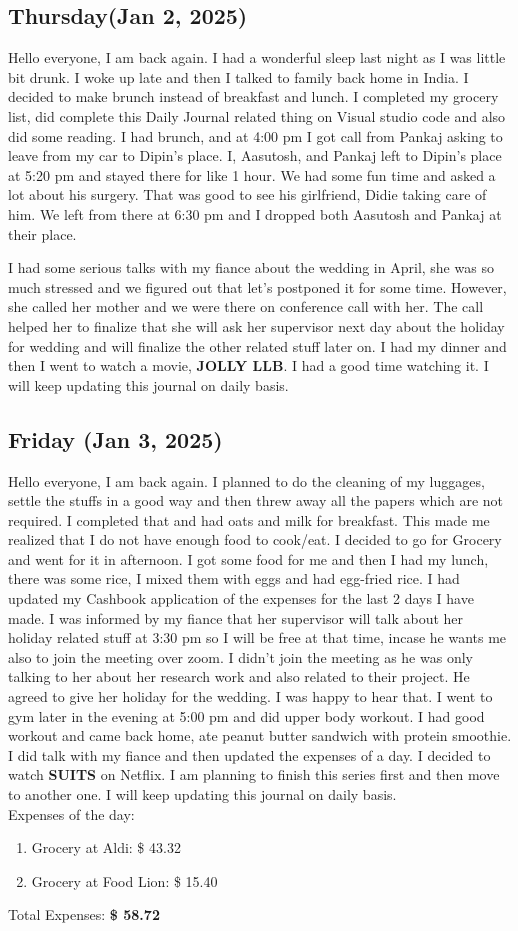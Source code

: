 \subsection*{Thursday(Jan 2, 2025)}
Hello everyone, I am back again. I had a wonderful sleep last night as I was little bit drunk. I woke up late and then I talked to family back home in India. I decided to make brunch instead of breakfast and lunch. I completed my grocery list, did complete this Daily Journal related thing on Visual studio code and also did some reading. I had brunch, and at 4:00 pm I got call from Pankaj asking to leave from my car to Dipin's place. I, Aasutosh, and Pankaj left to Dipin's place at 5:20 pm and stayed there for like 1 hour. We had some fun time and asked a lot about his surgery. That was good to see his girlfriend, Didie taking care of him. We left from there at 6:30 pm  and I dropped both Aasutosh and Pankaj at their place.

I had some serious talks with my fiance about the wedding in April, she was so much stressed and we figured out that let's postponed it for some time. However, she called her mother and we were there on conference call with her. The call helped her to finalize that she will ask her supervisor next day about the holiday for wedding and will finalize the other related stuff later on. I had my dinner and then I went to watch a movie, \textbf{JOLLY LLB}. I had a good time watching it. I will keep updating this journal on daily basis.
\subsection*{Friday (Jan 3, 2025)}
Hello everyone, I am back again. I planned to do the cleaning of my luggages, settle the stuffs in a good way and then threw away all the papers which are not required. I completed that and had oats and milk for breakfast. This made me realized that I do not have enough food to cook/eat. I decided to go for Grocery and went for it in afternoon. I got some food for me and then I had my lunch, there was some rice, I mixed them with eggs and had egg-fried rice. I had updated my Cashbook application of the expenses for the last 2 days I have made. I was informed by my fiance that her supervisor will talk about her holiday related stuff at 3:30 pm so I will be free at that time, incase he wants me also to join the meeting over zoom. I didn't join the meeting as he was only talking to her about her research work and also related to their project. He agreed to give her holiday for the wedding. I was happy to hear that. I went to gym later in the evening at 5:00 pm and did upper body workout. I had good workout and came back home, ate peanut butter sandwich with protein smoothie. I did talk with my fiance and then updated the expenses of a day. I decided to watch \textbf{SUITS} on Netflix. I am planning to finish this series first and then move to another one. I will keep updating this journal on daily basis.\\
Expenses of the day:
\begin{enumerate}
    \item Grocery at Aldi: \$ 43.32
    \item Grocery at Food Lion: \$ 15.40
\end{enumerate}
Total Expenses: \textbf{\$ 58.72}
